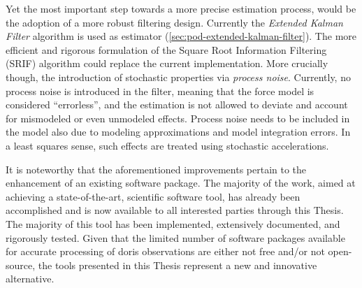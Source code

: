 Yet the most important step towards a more precise estimation process, would be the adoption 
of a more robust filtering design. Currently the \emph{Extended Kalman Filter} algorithm is used 
as estimator (\autoref{sec:pod-extended-kalman-filter}). The more efficient and 
rigorous formulation of the Square Root Information Filtering (SRIF) algorithm could 
replace the current implementation. More crucially though, the introduction of stochastic 
properties via \emph{process noise}. Currently, no process noise is introduced in the filter, 
meaning that the force model is considered ``errorless'', and the estimation is not 
allowed to deviate and account for mismodeled or even unmodeled effects. Process noise 
needs to be included in the model also due to modeling approximations and model integration errors.
In a least squares sense, such effects are treated using stochastic accelerations.

\iffalse
It should be noted that the above constitute refinements to the already existing 
software package. The bulk of the work, to reach a state-of-the-art, scientific 
software tool has already been performed and via this Thesis is made available to all 
interested parties. By far the biggest part of such a tool is already in place, 
extensively documented and thoroughly tested. Considering the fact that the few 
software packages that do exist for accurate processing of \gls{doris} observations 
are either non-free and/or not open-sourced, the tools presented here constitute a 
novel alternative.
\fi

It is noteworthy that the aforementioned improvements pertain to the enhancement 
of an existing software package. The majority of the work, aimed at achieving a 
state-of-the-art, scientific software tool, has already been accomplished and 
is now available to all interested parties through this Thesis. The majority 
of this tool has been implemented, extensively documented, and rigorously tested. 
Given that the limited number of software packages available for accurate processing 
of \gls{doris} observations are either not free and/or not open-source, the 
tools presented in this Thesis represent a new and innovative alternative.

\iffalse
\gls{pod} analysis is a very challenging task, requiring multi-scientific expertise, 
coupled with efficient engineering. Given the accuracy requirements today (especially 
for altimetry missions on-board which \gls{doris} receivers are installed), the 
ever growing number of scientific satellites missions, and the widening of the application 
range (e.g. climate change studies), it constitutes a field of growing dynamics.
\fi
